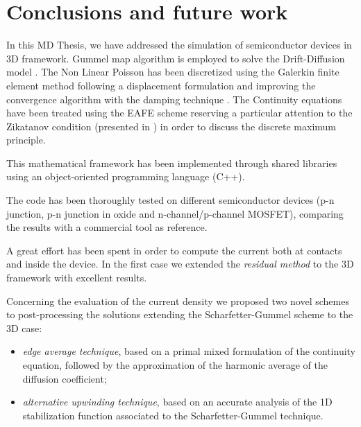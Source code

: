 \chapter*{Conclusions and future work}

In this MD Thesis, we have addressed the simulation of semiconductor devices in 3D framework. Gummel map algorithm \cite{GummelMap} is employed to solve the Drift-Diffusion model  \cite{Jackson:ElettroClassica}. The Non Linear Poisson has been discretized using the Galerkin finite element method \cite{quarteroni:NumApprox} following a displacement formulation and improving the convergence algorithm with the damping technique \cite{DefulhardDamp}. The Continuity equations have been treated using the EAFE scheme \cite{Zikatanov:EAFE1} reserving a particular attention to the Zikatanov condition (presented in \cite{Zikatanov:EAFE1}) in order to discuss the discrete maximum principle.

This mathematical framework has been implemented through shared libraries using an object-oriented programming language (C++).

The code has been thoroughly tested on different semiconductor devices (p-n junction, p-n junction in oxide and n-channel/p-channel MOSFET), comparing the results with a commercial tool as reference.

\vspace{1cm}

A great effort has been spent in order to compute the current both at contacts and inside the device. In the first case we extended the \textit{residual method} \cite{ContactCurrentRM} to the 3D framework with excellent results.

Concerning the evaluation of the current density we proposed two novel schemes to post-processing the solutions extending the Scharfetter-Gummel scheme to the 3D case:
\begin{itemize}
\item \textit{edge average technique}, based on a primal mixed formulation of the continuity equation, followed by the approximation of the harmonic average of the diffusion coefficient;
\item \textit{alternative upwinding technique}, based on an accurate analysis of the 1D stabilization function associated to the Scharfetter-Gummel technique.   
\end{itemize}

\vspace{1cm}

